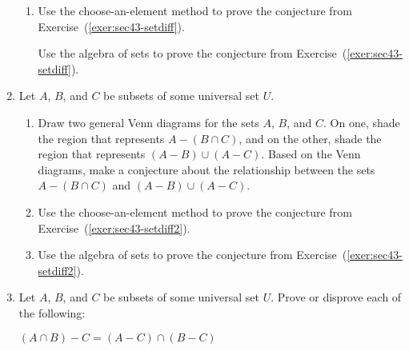 \begin{enumerate}
\begin{enumerate}
  \item Use the choose-an-element method to prove the conjecture from Exercise~(\ref{exer:sec43-setdiff}).

  \yitem Use the algebra of sets to prove the conjecture from Exercise~(\ref{exer:sec43-setdiff}).
\end{enumerate}




\item Let  $A$, $B$,  and  $C$  be subsets of some universal set  $U$\!.
\label{exer:sec43-6}%
\begin{enumerate}
  \item Draw two general Venn diagrams for the sets  $A$, $B$, and  $C$.  On one, shade the region that represents  $A - \left( {B \cap C} \right)$, and on the other, shade the region that represents  $\left( {A - B} \right) \cup \left( {A - C} \right)$.  Based on the Venn diagrams, make a conjecture about the relationship between the sets  $A - \left( {B \cap C} \right)$  and  $\left( {A - B} \right) \cup \left( {A - C} \right)$.
\label{exer:sec43-setdiff2}%

  \item Use the choose-an-element method to prove the conjecture from 
Exercise~(\ref{exer:sec43-setdiff2}).

  \item Use the algebra of sets to prove the conjecture from 
Exercise~(\ref{exer:sec43-setdiff2}).
\end{enumerate}


%

\item Let $A$, $B$,  and  $C$  be subsets of some universal set  $U$\!.  \label{exer53:exer6} Prove or disprove each of the following:
\begin{enumerate}
\yitem $\left( A \cap B \right) - C = \left( A - C \right) \cap \left( B - C \right)$ 


\end{enumerate}
\end{enumerate}
